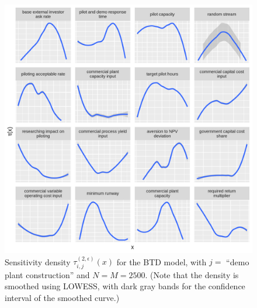 \documentclass[12pt]{article}
\begin{document}
\begin{figure}
    \centering
    \includegraphics[width=\linewidth]{figures/btd-tau.png}
    \caption{Sensitivity density $\tau_{i,j}^{(2,\epsilon)}(x)$ for the BTD model, with $j =$ ``demo plant construction'' and $N = M = 2500$. (Note that the density is smoothed using LOWESS, with dark gray bands for the confidence interval of the smoothed curve.)}
    \label{fig:btd-tau}
\end{figure}
\end{document}
